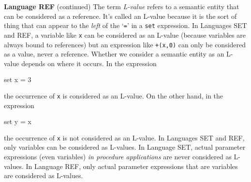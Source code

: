 \begin{minipage}[t]{\sw}
\slidenumber
\LARGE
{\bf Language REF} (continued)\exx
The term {\em L-value} refers
to a semantic entity that can be considered as a reference.
It's called an L-value because it is the sort of thing
that can appear to the {\em left} of the `\verb'=''
in a \verb'set' expression.
In Languages SET and REF,
a variable like \verb'x' can be considered as an L-value
(because variables are always bound to references)
but an expression like \verb'+(x,0)' can only be considered
as a value, never a reference.\exx
Whether we consider a semantic entity
as an L-value depends on where it occurs.
In the expression
{\Large
\begin{qv}
set x = 3
\end{qv}
}
the occurrence of \verb'x' is considered as an L-value.
On the other hand, in the expression
{\Large
\begin{qv}
set y = x
\end{qv}
}
the occurrence of \verb'x' is not considered as an L-value.\exx
In Languages SET and REF, only variables can be considered as L-values.
In Language SET, actual parameter expressions (even variables)
{\em in procedure applications} are never considered as L-values.
In Language REF, only actual parameter expressions that are variables
are considered as L-values.
\end{minipage}
\clearpage

